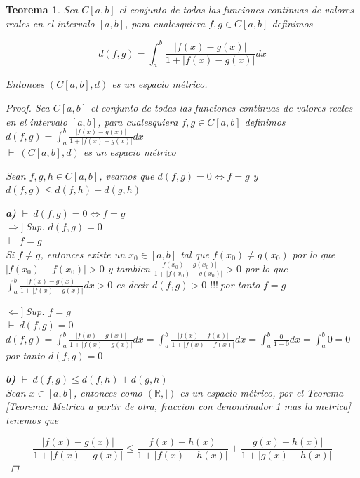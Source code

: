 \documentclass[oneside]{book} %
\theoremstyle{Teorema}
\newtheorem{Teorema}[Definicion]{Teorema}
\theoremstyle{Ejemplos}
\theoremstyle{[Obs]}
\newcommand{\abs}[1]{\left|#1\right|} %
\newcommand{\absSymbol}{\left|\right.} %
\renewcommand{\{}{\left\lbrace} %
\renewcommand{\}}{\right\rbrace} %
\newcommand{\R}{\mathbb{R}} %
\newcommand{\pd}{$\vdash\ $} %
\renewcommand{\c}{$!!!\ $} %
\newcommand{\necesidad}{$\Rightarrow]\ $} %
\newcommand{\suficiencia}{$\Leftarrow]\ $} %
\begin{document}
			\begin{Teorema}\setlength{\parindent}{0em}
				
				Sea $C[a, b]$ el conjunto de todas las funciones continuas de valores reales en el intervalo $[a, b]$, para cualesquiera $f, g \in C[a, b]$ definimos 

				\[ d(f, g) = \int_{a}^{b} \frac{\abs{f(x) - g(x)}}{1 + \abs{f(x) - g(x)}} dx \] 

				Entonces $(C[a, b], d)$ es un espacio métrico.
				
				\begin{proof}
					
					Sea $C[a, b]$ el conjunto de todas las funciones continuas de valores reales en el intervalo $[a, b]$, para cualesquiera $f, g \in C[a, b]$ definimos $d(f, g) = \int_{a}^{b} \frac{\abs{f(x) - g(x)}}{1 + \abs{f(x) - g(x)}} dx$ \\
					\pd $(C[a, b], d)$ es un espacio métrico

					Sean $f, g, h \in C[a, b]$, veamos que $d(f, g) = 0 \Leftrightarrow f = g$ y $d(f, g) \leq d(f, h) + d(g, h)$

					\textbf{a)} \pd $d(f, g) = 0 \Leftrightarrow f = g$ \\
					\necesidad Sup. $d(f, g) = 0$ \\
					\pd $f = g$ \\
					Si $f \neq g$, entonces existe un $x_0 \in [a, b]$ tal que $f(x_0) \neq g(x_0)$ por lo que $\abs{f(x_0) - f(x_0)} > 0$ y tambien $\frac{\abs{f(x_0) - g(x_0)}}{1 + \abs{f(x_0) - g(x_0)}} > 0$ por lo que $\int_{a}^{b} \frac{\abs{f(x) - g(x)}}{1 + \abs{f(x) - g(x)}} dx > 0$ es decir $d(f, g) > 0$ \c por tanto $f = g$ 

					\suficiencia Sup. $f = g$ \\
					\pd $d(f, g) = 0$ \\
					$d(f, g) = \int_{a}^{b} \frac{\abs{f(x) - g(x)}}{1 + \abs{f(x) - g(x)}} dx = \int_{a}^{b} \frac{\abs{f(x) - f(x)}}{1 + \abs{f(x) - f(x)}} dx = \int_{a}^{b} \frac{0}{1 + 0} dx = \int_{a}^{b} 0 = 0$ por tanto $d(f, g) = 0$

					\textbf{b)} \pd $d(f, g) \leq d(f, h) + d(g, h)$ \\
					Sean $x \in [a, b]$, entonces como $(\R, \absSymbol)$ es un espacio métrico, por el Teorema \ref{Teorema: Metrica a partir de otra, fraccion con denominador 1 mas la metrica} tenemos que 

					\[ \frac{\abs{f(x) - g(x)}}{1 + \abs{f(x) - g(x)}} \leq \frac{\abs{f(x) - h(x)}}{1 + \abs{f(x) - h(x)}} + \frac{\abs{g(x) - h(x)}}{1 + \abs{g(x) - h(x)}} \]


\end{proof}
\end{Teorema}
\end{document}
